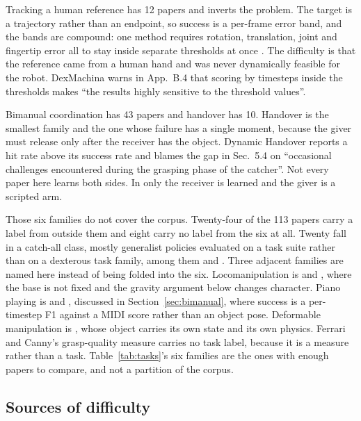 Tracking a human reference has 12 papers and inverts the problem. The target is a trajectory
rather than an endpoint, so success is a per-frame error band, and the bands are compound: one
method requires rotation, translation, joint and fingertip error all to stay inside separate
thresholds at once \cite{maniptrans_2025}. The difficulty is that the reference came from a human
hand and was never dynamically feasible for the robot. DexMachina \cite{dexmachina_2025} warns in
App.~B.4 that scoring by timesteps inside the thresholds makes ``the results highly sensitive to
the threshold values''.

Bimanual coordination has 43 papers and handover has 10. Handover is the smallest family and
the one whose failure has a single moment, because the giver must release only after the
receiver has the object. Dynamic Handover \cite{dynamic_handover_2023} reports a hit rate above
its success rate and blames the gap in Sec.~5.4 on ``occasional challenges encountered during
the grasping phase of the catcher''. Not every paper here learns both sides. In
\cite{dexterous_handover_2025} only the receiver is learned and the giver is a scripted arm.

Those six families do not cover the corpus. Twenty-four of the 113 papers carry a label
from outside them and eight carry no label from the six at all. Twenty fall in a catch-all
class, mostly generalist policies evaluated on a task suite rather than on a dexterous task
family, among them \cite{pi0_2024,pi05_2025,pistar06_2025,openvla_2024} and
\cite{gemini_robotics_15_2025}. Three adjacent families are named here instead of being folded
into the six. Locomanipulation is \cite{humanplus_2024,omnih2o_2024} and \cite{groot_n16_2025},
where the base is not fixed and the gravity argument below changes character. Piano playing is
\cite{robopianist_2023,rp1m_2024} and \cite{pianomime_2024}, discussed in
Section~\ref{sec:bimanual}, where success is a per-timestep F1 against a MIDI score rather than
an object pose. Deformable manipulation is \cite{dexdeform_2023}, whose object carries its own
state and its own physics. Ferrari and Canny's grasp-quality measure \cite{ferrari_canny_1992}
carries no task label, because it is a measure rather than a task. Table~\ref{tab:tasks}'s six
families are the ones with enough papers to compare, and not a partition of the corpus.

\subsection{Sources of difficulty}
\label{sec:taxonomy:hard}

